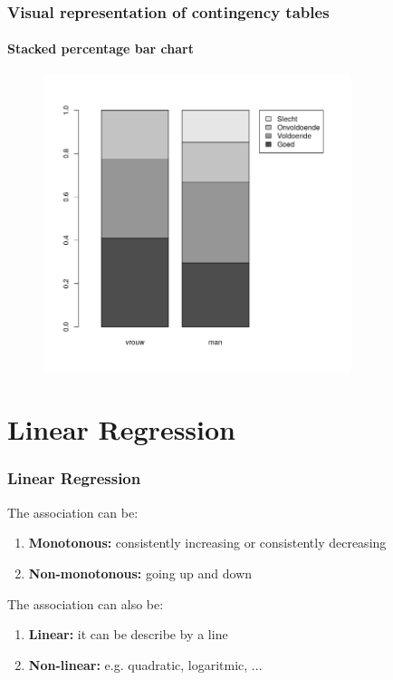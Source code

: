 \documentclass{beamer}
\begin{document}
\begin{frame}
  \frametitle{Visual representation of contingency tables}
  \framesubtitle{Stacked percentage bar chart}
  
  \begin{figure}
    \centering
    \includegraphics[width=0.80\textwidth]{img/2var-rependiagram-waardering-mv}
  \end{figure}

\end{frame}

\section{Linear Regression}
\sectionframelogo{}

\begin{frame}
  \frametitle{Linear Regression}
  
\vfill
  The association can be:
  \begin{enumerate}
    \item \textbf{Monotonous:} consistently increasing or consistently decreasing
    \item \textbf{Non-monotonous:} going up and down
  \end{enumerate}
\vfill
  The association can also be:
  \begin{enumerate}
    \item \textbf{Linear:} it can be describe by a line
    \item \textbf{Non-linear:} e.g. quadratic, logaritmic, ...
  \end{enumerate}
\end{frame}
\end{document}
